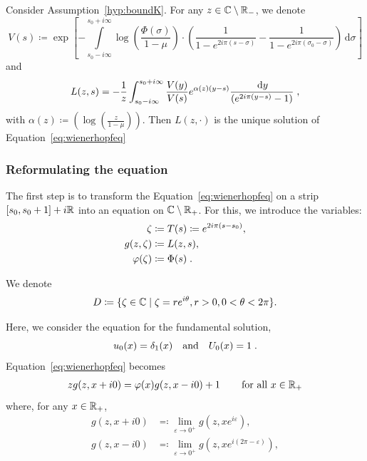 \documentclass[11pt]{amsart}
\newcommand{\diff}{\,\mathrm{d}}
\begin{document}
\begin{theorem}
\label{th:SolutionWH}Consider Assumption~\ref{hyp:boundK}. 
For any $z \in \mathbb{C} \setminus \mathbb{R}_-$, we denote
\begin{equation}
    V(s) \coloneqq \exp \left[
        - \int\limits_{s_0-i\infty}^{s_0+i\infty}\log \left( \frac{\Phi(\sigma)}{1-\mu}\right)
        \cdot \left(
            \frac{1}{1-e^{2i\pi(s-\sigma)}} - \frac{1}{1-e^{2i\pi(\sigma_0-\sigma)}}
         \right) \diff \sigma 
        \right]
        \label{def:V}
    \end{equation}
and 
\begin{equation}\label{eq:exprL}
    L(z,s) 
    = 
   - \frac{1}{z}\int_{s_0-i\infty}^{s_0+i\infty} \frac{V(y)}{V(s)} e^{ \alpha(z)(y-s)}
   \frac{\diff y}{(e^{2i\pi(y-s)}-1)}
   \eqfinv
\end{equation}
with $\alpha(z) \coloneqq  
    \left(\log \left( \frac{z}{1-\mu}\right)\right)$.
Then $L(z,\cdot)$ is the unique solution of Equation~\eqref{eq:wienerhopfeq}
\end{theorem}

\subsubsection{Reformulating the equation}
\label{s:reformulate_eq}
\mbox{}

The first step is to transform the Equation~\eqref{eq:wienerhopfeq} on a strip $[s_0, s_0+1] + i \mathbb{R}$ into an equation on $\mathbb{C} \setminus \mathbb{R}_+$. For this, we introduce the variables:
    \begin{align}
        \zeta & \coloneqq T(s) \coloneqq e^{2i\pi(s-s_0)}, \label{def:zeta}\\
        g(z,\zeta) &\coloneqq L(z,s), \label{def:g} \\
        \varphi(\zeta) &\coloneqq \Phi(s) \; .
        \label{def:Phi}
    \end{align}

We denote 
\begin{equation}\label{def:D}
D \coloneqq \{ \zeta \in \mathbb{C} \mid \zeta = re^{i\theta}, r > 0, 0 < \theta < 2\pi \}.
\end{equation}


Here, we consider the equation for the fundamental solution, \ie 
$$u_0(x) = \delta_1(x) \quad \text{and} \quad U_0(x) = 1 \; .$$ Equation~\eqref{eq:wienerhopfeq} becomes
\begin{align}
    \label{eq:WH3.5}
    z g(z, x+i0) = \varphi(x)g(z, x-i0) + 1 \, \qquad \text{for all $x\in\mathbb{R}_+$}
\end{align}
where, for any $x \in \mathbb{R}_+$, 
\begin{align*}
    g(z, x+i0) &\eqqcolon \lim_{\varepsilon\to 0^+}  g(z, xe^{i\varepsilon}),\\
    g(z, x-i0) &\eqqcolon \lim_{\varepsilon\to 0^+}  g(z, xe^{i(2\pi-\varepsilon)}),\\
\end{align*}
\end{document}
